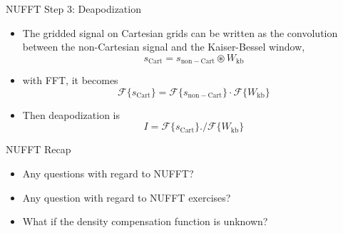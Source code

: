 \begin{frame}{NUFFT Step 3: Deapodization}
	
	\begin{itemize}
		\item The gridded signal on Cartesian grids can be written as the convolution between the non-Cartesian signal and the Kaiser-Bessel window,
		\begin{equation}
			s_\mathrm{Cart} = s_\mathrm{non-Cart} \circledast W_\mathrm{kb}
		\end{equation}
	
		\vspace{1em}
		
		\item with FFT, it becomes
		\begin{equation}
			\mathcal{F} \{s_\mathrm{Cart} \} = \mathcal{F} \{ s_\mathrm{non-Cart} \} \cdot \mathcal{F} \{ W_\mathrm{kb} \}
		\end{equation}
		
		\vspace{1em}
	
		\item Then deapodization is
		\begin{equation}
			I = \mathcal{F} \{s_\mathrm{Cart} \} ./ \mathcal{F} \{ W_\mathrm{kb} \}
		\end{equation}
	
	\end{itemize}
	
\end{frame}


\begin{frame}{NUFFT Recap}
	\begin{itemize}
		\item Any questions with regard to NUFFT?
		\vspace{2em}
		\item Any question with regard to NUFFT exercises?
		\vspace{4em}
		\item What if the density compensation function is unknown?
	\end{itemize}
\end{frame}


